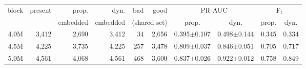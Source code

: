 \begin{tabular}{r rrr rr cc cc}
\toprule
block & present & prop. & dyn. & bad & good & \multicolumn{2}{c}{PR-AUC} & \multicolumn{2}{c}{F$_1$}\\
\cmidrule(lr){7-8}\cmidrule(lr){9-10}
 & & embedded & embedded & \multicolumn{2}{c}{(shared set)} & prop. & dyn. & prop. & dyn.\\
\midrule
4.0M & 3,412 & 2,690 & 3,412 & 34 & 2,656 & 0.395{\scriptsize$\pm$0.107} & 0.498{\scriptsize$\pm$0.144} & 0.345 & 0.334\\
4.5M & 4,225 & 3,735 & 4,225 & 257 & 3,478 & 0.809{\scriptsize$\pm$0.037} & 0.846{\scriptsize$\pm$0.051} & 0.705 & 0.717\\
5.0M & 4,561 & 4,068 & 4,561 & 468 & 3,600 & 0.837{\scriptsize$\pm$0.026} & 0.922{\scriptsize$\pm$0.012} & 0.758 & 0.849\\
\bottomrule
\end{tabular}